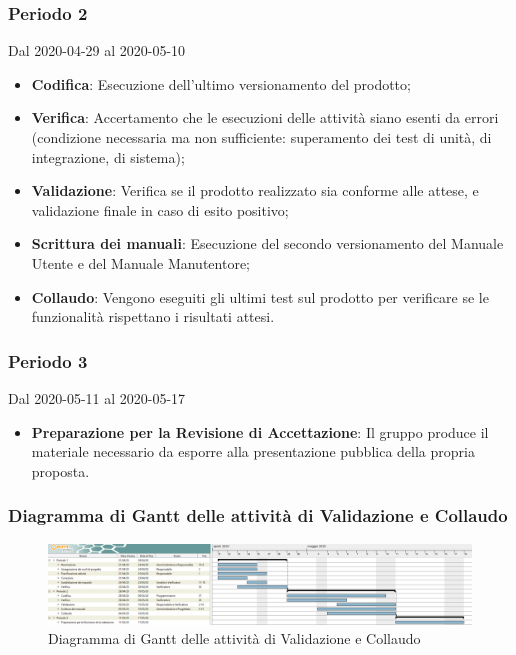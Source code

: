 \subsubsection{Periodo 2} 
Dal 2020-04-29 al 2020-05-10
\begin{itemize}
	\item \textbf{Codifica}: Esecuzione dell'ultimo versionamento del prodotto;
	\item \textbf{Verifica}: Accertamento che le esecuzioni delle attività siano esenti da errori (condizione necessaria ma non sufficiente: superamento dei test di unità, di integrazione, di sistema);
	\item \textbf{Validazione}: Verifica se il prodotto realizzato sia conforme alle attese, e validazione finale in caso di esito positivo;
	\item \textbf{Scrittura dei manuali}: Esecuzione del secondo versionamento del Manuale Utente e del Manuale Manutentore;
	\item \textbf{Collaudo}: Vengono eseguiti gli ultimi test sul prodotto per verificare se le funzionalità rispettano i risultati attesi.
\end{itemize}

\subsubsection{Periodo 3} 
Dal 2020-05-11 al 2020-05-17
\begin{itemize}
	\item \textbf{Preparazione per la Revisione di Accettazione}: Il gruppo produce il materiale necessario da esporre alla presentazione pubblica della propria proposta.
\end{itemize}


\newpage
\begin{landscape}
\subsubsection{Diagramma di Gantt delle attività di Validazione e Collaudo}
\pagestyle{empty}
\begin{figure}[h]
	\centering
	\includegraphics[scale=1.48]{Sezioni/DiagrammiGantt/Validazione.png}
	\caption{Diagramma di Gantt delle attività di Validazione e Collaudo}
\end{figure}
\end{landscape}